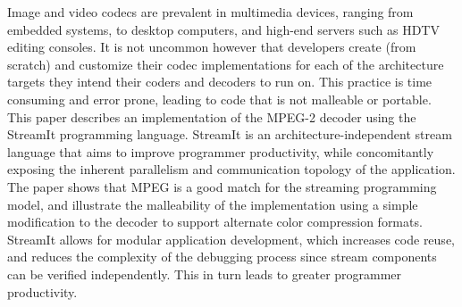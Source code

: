 Image and video codecs are prevalent in multimedia devices, ranging
from embedded systems, to desktop computers, and high-end servers such
as HDTV editing consoles. It is not uncommon however that developers
create (from scratch) and customize their codec implementations for
each of the architecture targets they intend their coders and decoders
to run on. This practice is time consuming and error prone, leading to
code that is not malleable or portable. This paper describes an
implementation of the MPEG-2 decoder using the StreamIt programming
language. StreamIt is an architecture-independent stream language that
aims to improve programmer productivity, while concomitantly exposing
the inherent parallelism and communication topology of the
application. The paper shows that MPEG is a good match for the
streaming programming model, and illustrate the malleability of the
implementation using a simple modification to the decoder to support
alternate color compression formats. StreamIt allows for modular
application development, which increases code reuse, and reduces the
complexity of the debugging process since stream components can be
verified independently. This in turn leads to greater programmer
productivity.
